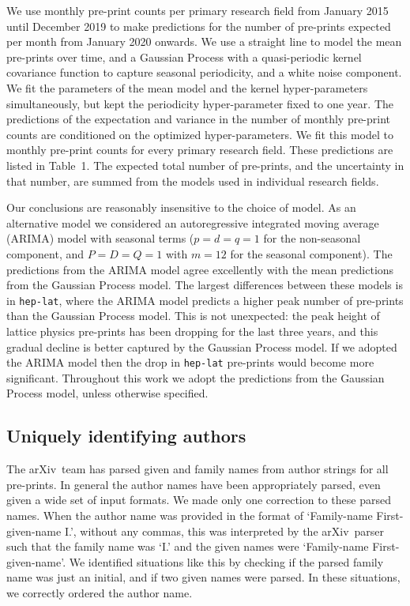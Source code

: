 \documentclass[]{rsos}%
\newcommand{\arxiv}{arXiv}
\begin{document}
We use monthly pre-print counts per primary research field from January 2015 until December 2019 to make predictions for the number of pre-prints expected per month from January 2020 onwards. We use a straight line to model the mean pre-prints over time, and a Gaussian Process with a quasi-periodic kernel covariance function to capture seasonal periodicity\cite{Rasmussen:2006,Ambikasaran:2014}, and a white noise component. We fit the parameters of the mean model and the kernel hyper-parameters simultaneously, but kept the periodicity hyper-parameter fixed to one year. The predictions of the expectation and variance in the number of monthly pre-print counts are conditioned on the optimized hyper-parameters. We fit this model to monthly pre-print counts for every primary research field. These predictions are listed in Table~1. The expected total number of pre-prints, and the uncertainty in that number, are summed from the models used in individual research fields. 

Our conclusions are reasonably insensitive to the choice of model. As an alternative model we considered an autoregressive integrated moving average (ARIMA) model\cite{BoxJenkins:1970} with seasonal terms ($p=d=q=1$ for the non-seasonal component, and $P=D=Q=1$ with $m=12$ for the seasonal component). The predictions from the ARIMA model agree excellently with the mean predictions from the Gaussian Process model. The largest differences between these models is in \texttt{hep-lat}, where the ARIMA model predicts a higher peak number of pre-prints than the Gaussian Process model. This is not unexpected: the peak height of lattice physics pre-prints has been dropping for the last three years, and this gradual decline is better captured by the Gaussian Process model. If we adopted the ARIMA model then the drop in \texttt{hep-lat} pre-prints would become more significant. Throughout this work we adopt the predictions from the Gaussian Process model, unless otherwise specified.



\subsection*{Uniquely identifying authors}

The \arxiv\ team has parsed given and family names from author strings for all pre-prints. In general the author names have been appropriately parsed, even given a wide set of input formats. We made only one correction to these parsed names. When the author name was provided in the format of `Family-name First-given-name I.', without any commas, this was interpreted by the \arxiv\ parser such that the family name was `I.' and the given names were `Family-name First-given-name'. We identified situations like this by checking if the parsed family name was just an initial, and if two given names were parsed. In these situations, we correctly ordered the author name.
\end{document}
